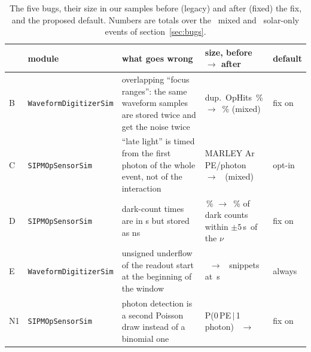 \documentclass[10pt]{article}
\newcommand{\code}[1]{\texttt{#1}}
\newcommand{\us}{\,\textmu s}
\begin{document}
\begin{table}[H]\centering\small
\caption{The five bugs, their size in our samples before (\textcolor{bef}{legacy}) and after
(\textcolor{aft}{fixed}) the fix, and the proposed default. Numbers are totals over the \numNmix\ mixed and \numNsol\
solar-only events of section~\ref{sec:bugs}.}
\label{tab:summary}
\renewcommand{\arraystretch}{1.15}
\begin{tabularx}{\linewidth}{@{}l >{\raggedright\arraybackslash\footnotesize}p{3.05cm} >{\raggedright\arraybackslash}X >{\raggedright\arraybackslash}p{4.1cm} >{\raggedright\arraybackslash}p{1.3cm}@{}}
\toprule
 & module & what goes wrong & size, before $\to$ after & default \\
\midrule
B & \code{WaveformDigitizerSim} & overlapping ``focus ranges'': the same waveform samples are stored twice and
  get the noise twice & dup.\ OpHits \numBlegacymixduphits\,\% $\to$ \numBfixBmixduphits\,\% (mixed) & fix on \\
C & \code{SIPMOpSensorSim} & ``late light'' is timed from the first photon of the whole event, not of the
  interaction & MARLEY Ar PE/photon \numClegacymixratio\ $\to$ \numCfixCmixratio\ (mixed) & opt-in \\
D & \code{SIPMOpSensorSim} & dark-count times are in \textmu s but stored as ns & \numDlegacynear\,\% $\to$
  \numDfixDnear\,\% of dark counts within $\pm5$\us\ of the $\nu$ & fix on \\
E & \code{WaveformDigitizerSim} & unsigned underflow of the readout start at the beginning of the window
  & \numEstockmixsnip\ $\to$ \numElegacymixsnip\ snippets at \numEwrapvalue\us & always \\
N1 & \code{SIPMOpSensorSim} & photon detection is a second Poisson draw instead of a binomial one &
  P(0\,PE\,$|$\,1 photon) \numNlegacyPZero\ $\to$ \numNfixNOnePZero & fix on \\
\bottomrule
\end{tabularx}
\end{table}
\end{document}
